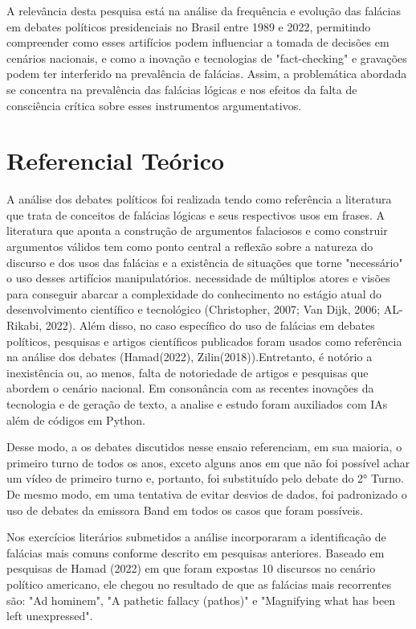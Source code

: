 \documentclass[12pt]{article}
\begin{document}
A relevância desta pesquisa está na análise da frequência e evolução das falácias em debates políticos presidenciais no Brasil entre 1989 e 2022, permitindo compreender como esses artifícios podem influenciar a tomada de decisões em cenários nacionais, e como a inovação e tecnologias de "fact-checking" e gravações podem ter interferido na prevalência de falácias. Assim, a problemática abordada se concentra na prevalência das falácias lógicas e nos efeitos da falta de consciência crítica sobre esses instrumentos argumentativos.

\section{Referencial Teórico} \label{sec:Referencial Teorico}
A análise dos debates políticos foi realizada tendo como referência a literatura que trata de conceitos de falácias lógicas e seus respectivos usos em frases. A literatura que aponta a construção de argumentos falaciosos e como construir argumentos válidos tem como ponto central a reflexão sobre a natureza do discurso e dos usos das falácias e a existência de situações que torne "necessário" o uso desses artifícios manipulatórios. necessidade de múltiplos atores e visões para conseguir abarcar a complexidade do conhecimento no estágio atual do desenvolvimento científico e tecnológico (Christopher, 2007; Van Dijk, 2006; AL-Rikabi, 2022). Além disso, no caso específico do uso de falácias em debates políticos, pesquisas e artigos científicos publicados foram usados como referência na análise dos debates (Hamad(2022), Zilin(2018)).Entretanto, é notório a inexistência ou, ao menos, falta de notoriedade de artigos e pesquisas que abordem o cenário nacional. Em consonância com as recentes inovações da tecnologia e de geração de texto, a analise e estudo foram auxiliados com IAs além de códigos em Python.

Desse modo, a os debates discutidos nesse ensaio referenciam, em sua maioria, o primeiro turno de todos os anos, exceto alguns anos em que não foi possível achar um vídeo de primeiro turno e, portanto, foi substituído pelo debate do 2° Turno. De mesmo modo, em uma tentativa de evitar desvios de dados, foi padronizado o uso de debates da emissora Band em todos os casos que foram possíveis.

Nos exercícios literários submetidos a análise incorporaram a identificação de falácias mais comuns conforme descrito em pesquisas anteriores. Baseado em pesquisas de Hamad (2022) em que foram expostas 10 discursos no cenário político americano, ele chegou no resultado de que as falácias mais recorrentes são: "Ad hominem", "A pathetic fallacy (pathos)" e "Magnifying what has 
been left unexpressed".
\end{document}
